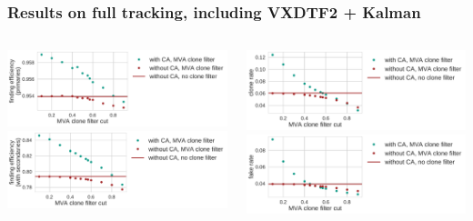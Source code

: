 \documentclass[18pt, aspectratio=169]{beamer}
\begin{document}
\begin{frame}
  \frametitle{Results on full tracking,  including VXDTF2 + Kalman}
  \begin{columns}
    \begin{column}{0.5\textwidth}
      \centering
      \includegraphics[width=1.0\textwidth]{figures/ca_is_matched_primaries_fullreco.pdf}\\
      \includegraphics[width=1.0\textwidth]{figures/ca_is_matched_with_secondaries_fullreco.pdf}
    \end{column}
    \begin{column}{0.5\textwidth}
      \centering
      \includegraphics[width=1.0\textwidth]{figures/ca_clone_rate_fullreco.pdf}\\
      \includegraphics[width=1.0\textwidth]{figures/ca_fake_rate_fullreco.pdf}

\end{column}
\end{columns}
\end{frame}
\end{document}
